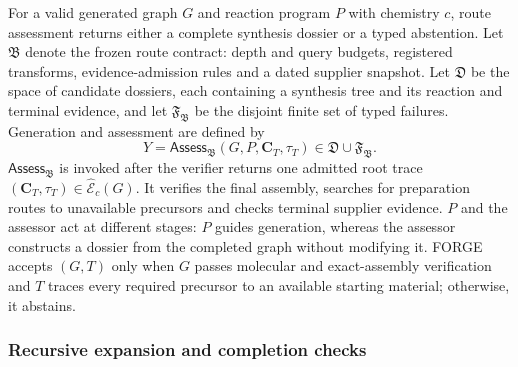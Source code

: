 For a valid generated graph $G$ and reaction program $P$ with chemistry $c$, route assessment
returns either a
complete synthesis dossier or a typed abstention.
Let $\mathfrak B$ denote the frozen route contract: depth and query budgets, registered transforms,
evidence-admission rules and a dated supplier snapshot. Let $\mathfrak D$ be the space of candidate
dossiers, each containing a synthesis tree and its reaction and terminal evidence, and let
$\mathfrak F_{\mathfrak B}$ be the disjoint finite set of typed failures.
Generation and assessment are defined by
\begin{equation}
    Y=\mathsf{Assess}_{\mathfrak B}(G,P,\mathbf C_T,\tau_T)
    \in\mathfrak D\cup\mathfrak F_{\mathfrak B}.
\end{equation}
$\mathsf{Assess}_{\mathfrak B}$ is invoked after the verifier returns one admitted root trace
$(\mathbf C_T,\tau_T)\in\widehat{\mathcal E}_c(G)$. It verifies the final assembly, searches for
preparation routes to unavailable precursors and checks terminal supplier evidence. $P$ and the assessor act at different stages: $P$ guides generation, whereas the assessor
constructs a dossier from the completed graph without modifying it.
FORGE accepts $(G,T)$ only when $G$ passes molecular and exact-assembly verification and $T$ traces
every required precursor to an available starting material; otherwise, it abstains.

\subsubsection{Recursive expansion and completion checks}


